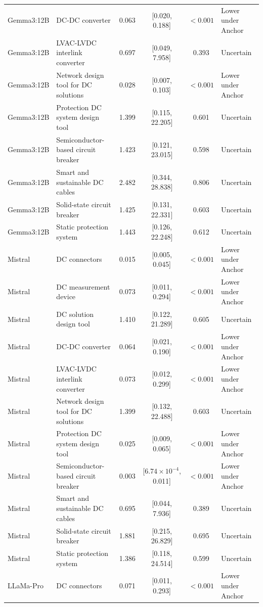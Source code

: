 \begin{longtable}[tbp]{p{2.2cm}p{5.0cm}cccp{3.2cm}}
Gemma3:12B & DC-DC converter & 0.063 & [0.020, 0.188] & $<0.001$ & Lower under Anchor \\
Gemma3:12B & LVAC-LVDC interlink converter & 0.697 & [0.049, 7.958] & 0.393 & Uncertain \\
Gemma3:12B & Network design tool for DC solutions & 0.028 & [0.007, 0.103] & $<0.001$ & Lower under Anchor \\
Gemma3:12B & Protection DC system design tool & 1.399 & [0.115, 22.205] & 0.601 & Uncertain \\
Gemma3:12B & Semiconductor-based circuit breaker & 1.423 & [0.121, 23.015] & 0.598 & Uncertain \\
Gemma3:12B & Smart and sustainable DC cables & 2.482 & [0.344, 28.838] & 0.806 & Uncertain \\
Gemma3:12B & Solid-state circuit breaker & 1.425 & [0.131, 22.331] & 0.603 & Uncertain \\
Gemma3:12B & Static protection system & 1.443 & [0.126, 22.248] & 0.612 & Uncertain \\
Mistral & DC connectors & 0.015 & [0.005, 0.045] & $<0.001$ & Lower under Anchor \\
Mistral & DC measurement device & 0.073 & [0.011, 0.294] & $<0.001$ & Lower under Anchor \\
Mistral & DC solution design tool & 1.410 & [0.122, 21.289] & 0.605 & Uncertain \\
Mistral & DC-DC converter & 0.064 & [0.021, 0.190] & $<0.001$ & Lower under Anchor \\
Mistral & LVAC-LVDC interlink converter & 0.073 & [0.012, 0.299] & $<0.001$ & Lower under Anchor \\
Mistral & Network design tool for DC solutions & 1.399 & [0.132, 22.488] & 0.603 & Uncertain \\
Mistral & Protection DC system design tool & 0.025 & [0.009, 0.065] & $<0.001$ & Lower under Anchor \\
Mistral & Semiconductor-based circuit breaker & 0.003 & [$6.74\times 10^{-4}$, 0.011] & $<0.001$ & Lower under Anchor \\
Mistral & Smart and sustainable DC cables & 0.695 & [0.044, 7.936] & 0.389 & Uncertain \\
Mistral & Solid-state circuit breaker & 1.881 & [0.215, 26.829] & 0.695 & Uncertain \\
Mistral & Static protection system & 1.386 & [0.118, 24.514] & 0.599 & Uncertain \\
LLaMa-Pro & DC connectors & 0.071 & [0.011, 0.293] & $<0.001$ & Lower under Anchor \\

\end{longtable}
